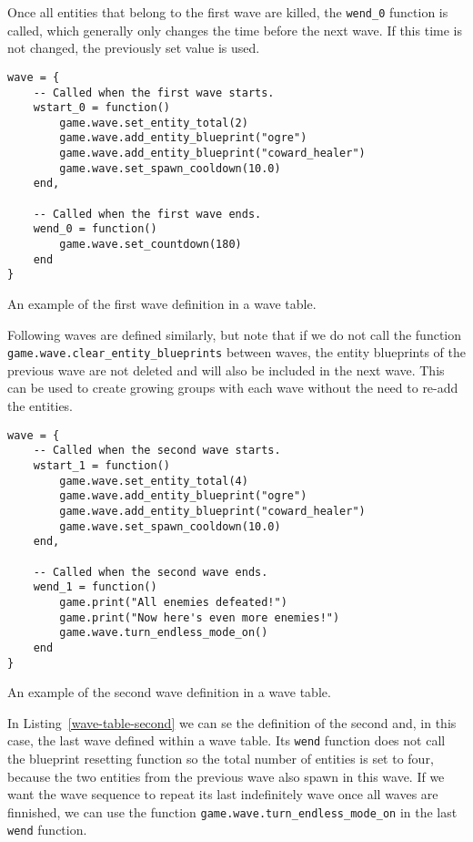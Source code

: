 Once all entities that belong to the first wave are killed, the \texttt{wend\_0} function is called, which generally only changes the
time before the next wave. If this time is not changed, the previously set value is used.

\begin{listing}[H]
    \centering
    \begin{lstlisting}
wave = {
    -- Called when the first wave starts.
    wstart_0 = function()
        game.wave.set_entity_total(2)
        game.wave.add_entity_blueprint("ogre")
        game.wave.add_entity_blueprint("coward_healer")
        game.wave.set_spawn_cooldown(10.0)
    end,

    -- Called when the first wave ends.
    wend_0 = function()
        game.wave.set_countdown(180)
    end
}
    \end{lstlisting}
    \caption{An example of the first wave definition in a wave table.}
    \label{wave-table-first}
\end{listing}

Following waves are defined similarly, but note that if we do not call the function \texttt{game.wave.clear\_entity\_blueprints} between
waves, the entity blueprints of the previous wave are not deleted and will also be included in the next wave. This can be used to create
growing groups with each wave without the need to re-add the entities.

\begin{listing}[H]
    \centering
    \begin{lstlisting}
wave = {
    -- Called when the second wave starts.
    wstart_1 = function()
        game.wave.set_entity_total(4)
        game.wave.add_entity_blueprint("ogre")
        game.wave.add_entity_blueprint("coward_healer")
        game.wave.set_spawn_cooldown(10.0)
    end,

    -- Called when the second wave ends.
    wend_1 = function()
        game.print("All enemies defeated!")
        game.print("Now here's even more enemies!")
        game.wave.turn_endless_mode_on()
    end
}
    \end{lstlisting}
    \caption{An example of the second wave definition in a wave table.}
    \label{wave-table-second}
\end{listing}

In Listing~\ref{wave-table-second} we can se the definition of the second and, in this case, the last wave defined within a wave table.
Its \texttt{wend} function does not call the blueprint resetting function so the total number of entities is set to four, because the two
entities from the previous wave also spawn in this wave.
If we want the wave sequence to repeat its last indefinitely wave once all waves are finnished, we can use the function
\texttt{game.wave.turn\_endless\_mode\_on} in the last \texttt{wend} function.

